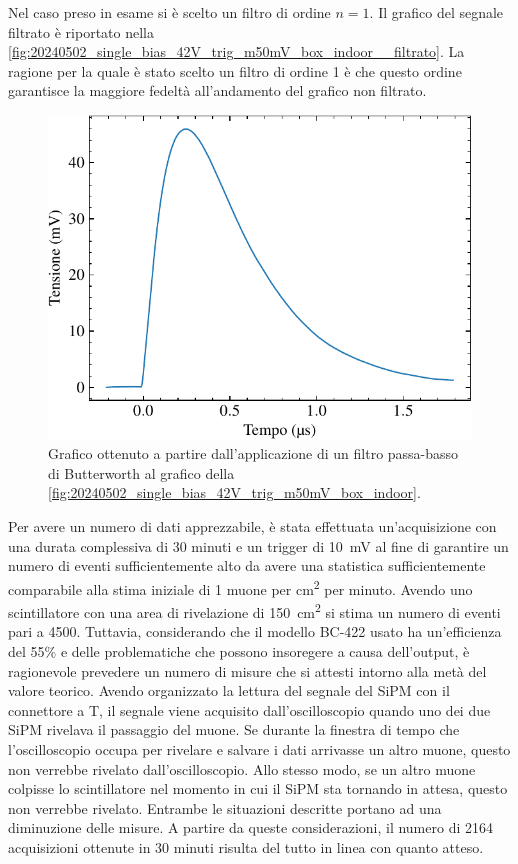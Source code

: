 Nel caso preso in esame si è scelto un filtro di ordine $n=1$. Il grafico del segnale filtrato è riportato nella \autoref*{fig:20240502_single_bias_42V_trig_m50mV_box_indoor__filtrato}.
La ragione per la quale è stato scelto un filtro di ordine 1 è che questo ordine garantisce la maggiore fedeltà all'andamento del grafico
non filtrato.
\begin{figure}[h!]
    \centering
    \includegraphics[width=.75\linewidth]{img/20240502_single_bias_42V_trig_m50mV_box_indoor__filtrato.pdf}
    \caption{Grafico ottenuto a partire dall'applicazione di un filtro passa-basso di Butterworth al grafico della \autoref*{fig:20240502_single_bias_42V_trig_m50mV_box_indoor}.}
    \label{fig:20240502_single_bias_42V_trig_m50mV_box_indoor__filtrato}
\end{figure}

Per avere un numero di dati apprezzabile, è stata effettuata un'acquisizione con una durata complessiva di 30 minuti e un trigger di
\SI{10}{\milli\volt} al fine di garantire un numero di eventi sufficientemente alto da avere una statistica sufficientemente comparabile
alla stima iniziale di 1 muone per \si{\square \centi \meter} per minuto. Avendo uno scintillatore con una area di rivelazione di 
\SI{150}{\square \centi \meter} si stima un numero di eventi pari a 4500. Tuttavia, considerando che il modello BC-422 usato ha un'efficienza
del 55\% e delle problematiche che possono insoregere a causa dell'output, è ragionevole prevedere un numero di misure che si attesti 
intorno alla metà del valore teorico. Avendo organizzato la lettura del segnale del SiPM con il connettore a T, il segnale viene acquisito 
dall'oscilloscopio quando uno dei due SiPM rivelava il passaggio del muone. Se durante la finestra di tempo che l'oscilloscopio occupa
per rivelare e salvare i dati arrivasse un altro muone, questo non verrebbe rivelato dall'oscilloscopio. Allo stesso modo, se un altro
muone colpisse lo scintillatore nel momento in cui il SiPM sta tornando in attesa, questo non verrebbe rivelato. Entrambe le situazioni descritte
portano ad una diminuzione delle misure. A partire da queste considerazioni, il numero di 2164 acquisizioni ottenute in 30 minuti
risulta del tutto in linea con quanto atteso.

